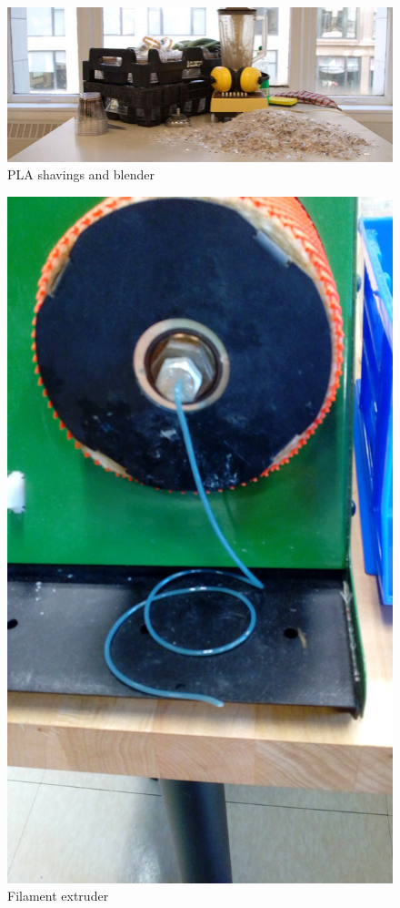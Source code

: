 \begin{figure}[h!]
\centering
\includegraphics[width=\hsize]{art/shavings.jpg}
\caption{\label{fig:art_1} PLA shavings and blender }
\end{figure}

\begin{figure}[h!]
\centering
\includegraphics[width=0.5\hsize]{art/IMG_20160801_121017.jpg}
\caption{\label{fig:art_2} Filament extruder }
\end{figure}

